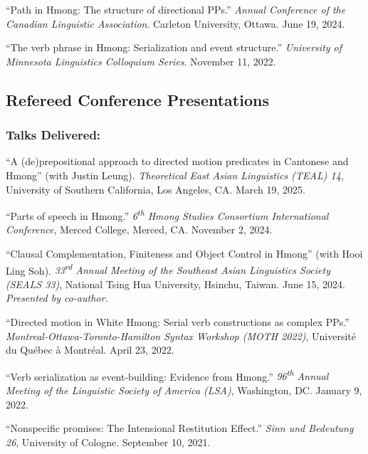 \documentclass[11pt,oneside,DIV=8,parskip=off,letterpaper]{scrarticle} %
\newlength{\spacingbefore}
\newlength{\spacingafter}
\newcommand{\myonecol}[1]{%
	\vspace{\spacingbefore}%
	\begin{minipage}[t]{\linewidth}%
		\strut#1%
	\end{minipage}%
	\vspace{\spacingafter}\par%
	}
\newcommand{\talk}[1]{%
	\myonecol{#1}%
	}
\begin{document}
\talk{``Path in Hmong: The structure of directional PPs.'' \textit{Annual Conference of the Canadian Linguistic Association}. Carleton University, Ottawa. June 19, 2024.}

\talk{``The verb phrase in Hmong: Serialization and event structure.'' \textit{University of Minnesota Linguistics Colloquium Series}. November 11, 2022.}


\subsection{Refereed Conference Presentations}

\subsubsection{Talks Delivered:}
\talk{``A (de)prepositional approach to directed motion predicates in Cantonese and Hmong'' (with Justin Leung). \textit{Theoretical East Asian Linguistics (TEAL) 14}, University of Southern California, Los Angeles, CA. March 19, 2025.}

\talk{``Parts of speech in Hmong.'' \textit{6\textsuperscript{th} Hmong Studies Consortium International Conference}, Merced College, Merced, CA. November 2, 2024.}

\talk{``Clausal Complementation, Finiteness and Object Control in Hmong'' (with Hooi Ling Soh). \textit{33\textsuperscript{rd} Annual Meeting of the Southeast Asian Linguistics Society (SEALS 33)}, National Tsing Hua University, Hsinchu, Taiwan. June 15, 2024. \emph{Presented by co-author.}} 

\talk{``Directed motion in White Hmong: Serial verb constructions as complex PPs.'' \textit{Montreal-Ottawa-Toronto-Hamilton Syntax Workshop (MOTH 2022)}, Universit\'e du Qu\'ebec \`a Montr\'eal. April 23, 2022.}

\talk{``Verb serialization as event-building: Evidence from Hmong.'' \textit{96\textsuperscript{th} Annual Meeting of the Linguistic Society of America (LSA)}, Washington, DC. January 9, 2022.}

\talk{``Nonspecific promises: The Intensional Restitution Effect.'' \textit{Sinn und Bedeutung 26}, University of Cologne. September 10, 2021.}
\end{document}
